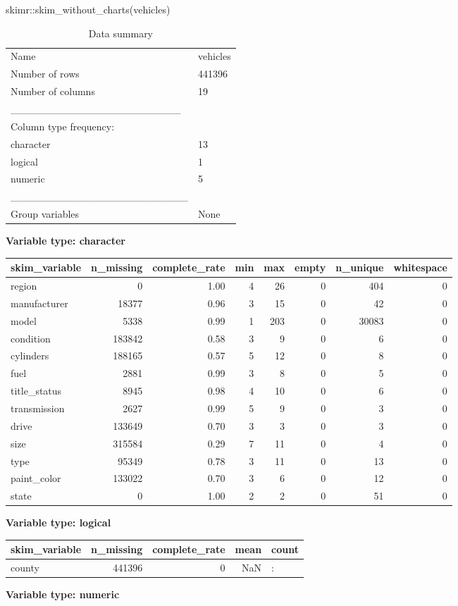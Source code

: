 \documentclass[
]{article}
\newenvironment{Shaded}{\begin{snugshade}}{\end{snugshade}}
\newcommand{\FunctionTok}[1]{\textcolor[rgb]{0.00,0.00,0.00}{#1}}
\newcommand{\NormalTok}[1]{#1}
\newcommand{\SpecialCharTok}[1]{\textcolor[rgb]{0.00,0.00,0.00}{#1}}
\begin{document}
\begin{Shaded}
\begin{Highlighting}[]
\NormalTok{skimr}\SpecialCharTok{::}\FunctionTok{skim\_without\_charts}\NormalTok{(vehicles)}
\end{Highlighting}
\end{Shaded}

\begin{longtable}[]{@{}ll@{}}
\caption{Data summary}\tabularnewline
\toprule
\endhead
Name & vehicles\tabularnewline
Number of rows & 441396\tabularnewline
Number of columns & 19\tabularnewline
\_\_\_\_\_\_\_\_\_\_\_\_\_\_\_\_\_\_\_\_\_\_\_ &\tabularnewline
Column type frequency: &\tabularnewline
character & 13\tabularnewline
logical & 1\tabularnewline
numeric & 5\tabularnewline
\_\_\_\_\_\_\_\_\_\_\_\_\_\_\_\_\_\_\_\_\_\_\_\_ &\tabularnewline
Group variables & None\tabularnewline
\bottomrule
\end{longtable}

\textbf{Variable type: character}

\begin{longtable}[]{@{}lrrrrrrr@{}}
\toprule
skim\_variable & n\_missing & complete\_rate & min & max & empty &
n\_unique & whitespace\tabularnewline
\midrule
\endhead
region & 0 & 1.00 & 4 & 26 & 0 & 404 & 0\tabularnewline
manufacturer & 18377 & 0.96 & 3 & 15 & 0 & 42 & 0\tabularnewline
model & 5338 & 0.99 & 1 & 203 & 0 & 30083 & 0\tabularnewline
condition & 183842 & 0.58 & 3 & 9 & 0 & 6 & 0\tabularnewline
cylinders & 188165 & 0.57 & 5 & 12 & 0 & 8 & 0\tabularnewline
fuel & 2881 & 0.99 & 3 & 8 & 0 & 5 & 0\tabularnewline
title\_status & 8945 & 0.98 & 4 & 10 & 0 & 6 & 0\tabularnewline
transmission & 2627 & 0.99 & 5 & 9 & 0 & 3 & 0\tabularnewline
drive & 133649 & 0.70 & 3 & 3 & 0 & 3 & 0\tabularnewline
size & 315584 & 0.29 & 7 & 11 & 0 & 4 & 0\tabularnewline
type & 95349 & 0.78 & 3 & 11 & 0 & 13 & 0\tabularnewline
paint\_color & 133022 & 0.70 & 3 & 6 & 0 & 12 & 0\tabularnewline
state & 0 & 1.00 & 2 & 2 & 0 & 51 & 0\tabularnewline
\bottomrule
\end{longtable}

\textbf{Variable type: logical}

\begin{longtable}[]{@{}lrrrl@{}}
\toprule
skim\_variable & n\_missing & complete\_rate & mean &
count\tabularnewline
\midrule
\endhead
county & 441396 & 0 & NaN & :\tabularnewline
\bottomrule
\end{longtable}

\textbf{Variable type: numeric}
\end{document}
